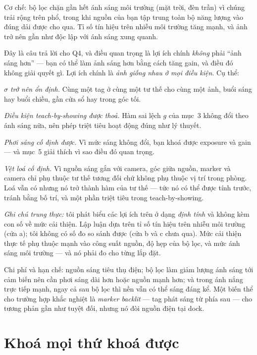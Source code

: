 \documentclass[../../marker.tex]{subfiles}
\begin{document}
Cơ chế: bộ lọc chặn gần hết ánh sáng môi trường (mặt trời, đèn trần) vì chúng trải rộng trên phổ, trong khi nguồn của bạn tập trung toàn bộ năng lượng vào đúng dải được cho qua. Tỉ số tín hiệu trên nhiễu môi trường tăng mạnh, và ảnh trở nên gần như độc lập với ánh sáng xung quanh.

Đây là câu trả lời cho Q4, và điều quan trọng là lợi ích chính \emph{không} phải ``ảnh sáng hơn'' --- bạn có thể làm ảnh sáng hơn bằng cách tăng gain, và điều đó không giải quyết gì. Lợi ích chính là \emph{ảnh giống nhau ở mọi điều kiện}. Cụ thể:

\emph{\(\sigma\) trở nên ổn định.} Cùng một tag ở cùng một tư thế cho cùng một ảnh, buổi sáng hay buổi chiều, gần cửa sổ hay trong góc tối.

\emph{Điều kiện teach-by-showing được thoả.} Hàm sai lệch \(g\) của  mục~3 không đổi theo ánh sáng nữa, nên phép triệt tiêu hoạt động đúng như lý thuyết.

\emph{Phơi sáng cố định được.} Vì mức sáng không đổi, bạn khoá được exposure và gain --- và mục~5 giải thích vì sao điều đó quan trọng.

\emph{Vệt loá cố định.} Vì nguồn sáng gắn với camera, góc giữa nguồn, marker và camera chỉ phụ thuộc tư thế tương đối chứ không phụ thuộc vị trí trong phòng. Loá vẫn có nhưng nó trở thành hàm của tư thế --- tức nó có thể được tính trước, tránh bằng bố trí, và một phần triệt tiêu trong teach-by-showing.

\emph{Ghi chú trung thực:} tôi phát biểu các lợi ích trên ở dạng \emph{định tính} và không kèm con số về mức cải thiện. Lập luận dựa trên tỉ số tín hiệu trên nhiễu môi trường (cửa a); tôi không có số đo so sánh được (cửa b và c chưa qua). Mức cải thiện thực tế phụ thuộc mạnh vào công suất nguồn, độ hẹp của bộ lọc, và mức ánh sáng môi trường --- và nó phải đo cho từng lắp đặt.

Chi phí và hạn chế: nguồn sáng tiêu thụ điện; bộ lọc làm giảm lượng ánh sáng tới cảm biến nên cần phơi sáng dài hơn hoặc nguồn mạnh hơn; và trong ánh nắng trực tiếp mạnh, ngay cả sau bộ lọc thì nền vẫn có thể sáng đáng kể. Một biến thể cho trường hợp khắc nghiệt là \emph{marker backlit} --- tag phát sáng từ phía sau --- cho tương phản gần như tuyệt đối, nhưng nó đòi nguồn điện tại dock.

\section{Khoá mọi thứ khoá được}
\end{document}
